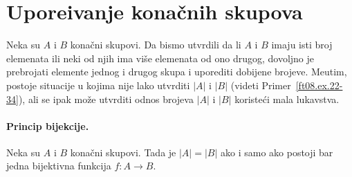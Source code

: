 \section{Upore\dj ivanje kona\v cnih skupova}

Neka su $A$ i $B$ kona\v cni skupovi. Da bismo utvrdili da li $A$ i $B$ imaju isti broj elemenata
ili neki od njih ima vi\v se elemenata od ono drugog, dovoljno je prebrojati elemente jednog i drugog skupa
i uporediti dobijene brojeve. Me\dj utim, postoje situacije u kojima nije lako utvrditi $|A|$ i $|B|$
(videti Primer~\ref{ft08.ex.22-34}), ali se ipak mo\v ze utvrditi odnos brojeva $|A|$ i $|B|$ koriste\'ci
mala lukavstva.

\paragraph{Princip bijekcije.}
  Neka su $A$ i $B$ kona\v cni skupovi. Tada je $|A| = |B|$ ako i samo ako postoji bar jedna bijektivna funkcija $f : A \to B$.
\begin{center}
  
\end{center}

